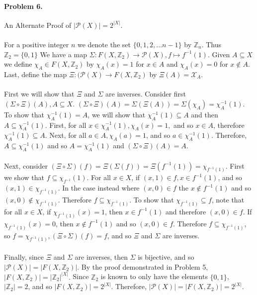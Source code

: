 \documentclass[12pt, letterpaper]{article}
\begin{document}
\paragraph{Problem 6.} An Alternate Proof of \(|\mathcal{P}(X)| = 2^{|X|}\).
\\
\\
For a positive integer \(n\) we denote the set \(\{0, 1, 2, . . .n - 1\}\) by \(\mathbb{Z}_{n}\). Thus
\(\mathbb{Z}_2 = \{0, 1\}\) We have a map \(\Sigma : F(X,\mathbb{Z}_2) \rightarrow \mathcal{P}(X) , f \mapsto f^{-1}(1)\). Given \(A \subseteq X\) we define
\( \chi_{A} \in F(X,\mathbb{Z}_2)\) by \(\chi_A(x) = 1\) for \(x \in A\) and \(\chi_A(x) = 0\)  for \(x \notin A\). Last, define the map \(\Xi: (\mathcal{P}(X) \rightarrow F(X, \mathbb{Z}_2)\) by \(\Xi(A) =  \mathcal{X}_A\). 
\\
\\
First we will show that \(\Xi\) and \(\Sigma\) are inverses. Consider first \((\Sigma \circ \Xi)(A), A \subseteq X\). \( (\Sigma \circ \Xi)(A) = \Sigma(\Xi (A)) =\Sigma(\chi_A) =  \chi^{-1}_{A}(1)\). To show that \(\chi^{-1}_{A}(1) = A\), we will show that \(\chi^{-1}_{A}(1) \subseteq A\) and then \(A \subseteq \chi^{-1}_{A}(1)\). First, for all \(x \in \chi^{-1}_{A}(1), \chi_A(x) = 1,\) and so \(x \in A\), therefore \(\chi^{-1}_{A}(1) \subseteq A\). Next, for all \(a \in A, \chi_A(a) = 1\), and so \(a \in \chi^{-1}_{A}(1)\). Therefore, \(A \subseteq \chi^{-1}_{A}(1)\) and so \( A = \chi^{-1}_{A}(1)\) and  \((\Sigma \circ \Xi)(A) = A\).
\\
\\
Next, consider \((\Xi \circ \Sigma)(f) = \Xi(\Sigma(f)) = \Xi(f^{-1}(1)) = \chi_{ f^{-1}(1)}\). First we show that \(f \subseteq \chi_{ f^{-1}}(1)\). For all \(x \in X\), if \((x, 1) \in f, x \in f^{-1}(1)\), and so \((x, 1) \in \chi_{ f^{-1}(1)}\). In the case instead where \((x, 0) \in f\) the \(x \notin f^{-1}(1)\) and so \((x, 0) \notin \chi_{ f^{-1}(1)}\). Therefore \(f \subseteq \chi_{ f^{-1}(1)}\). To show that  \(\chi_{ f^{-1}(1)} \subseteq f\),  note that for all \( x \in X\), if \( \chi_{ f^{-1}(1)}(x) = 1\), then \(x \in f^{-1}(1)\) and therefore \((x, 0) \in f\). If \( \chi_{ f^{-1}(1)}(x) = 0\), then \(x \notin f^{-1}(1)\) and so \((x, 0) \in f\). Therefore  \(f \subseteq \chi_{ f^{-1}(1)}\), so \(f = \chi_{ f^{-1}(1)}, (\Xi \circ \Sigma)(f) = f\), and so \(\Xi\) and \(\Sigma\) are inverses.
\\
\\
Finally, since \(\Xi\) and \(\Sigma\) are inverses, then \(\Sigma\) is bijective, and so \(|\mathcal{P}(X)| = |F(X, \mathbb{Z}_{2})|\). By the proof demonstrated in Problem 5, \(|F(X, \mathbb{Z}_{2})| = |\mathbb{Z}_{2}|^{|X|}.\) Since \(\mathbb{Z}_2\) is known to only have the elements \(\{0, 1\}\), \(|\mathbb{Z}_2| = 2\), and so \(|F(X, \mathbb{Z}_{2})| = 2^{|X|}\). Therefore, \(|\mathcal{P}(X)| = |F(X, \mathbb{Z}_{2})| = 2^{|X|}\).
\end{document}
